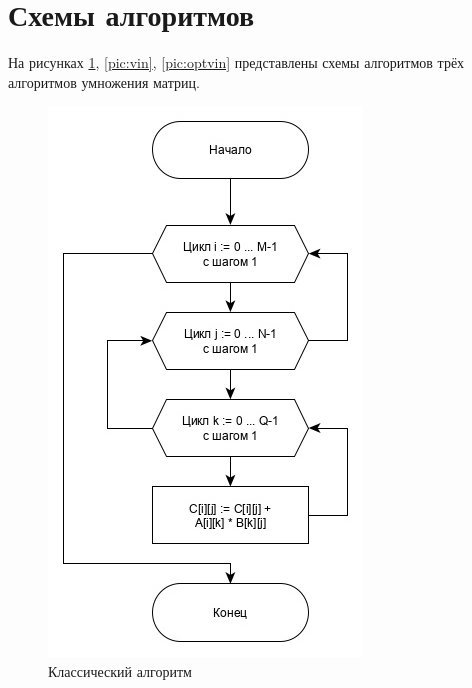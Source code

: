 \documentclass[12pt, a4paper]{report}
\begin{document}
	\section{Схемы алгоритмов}
	На рисунках \ref{pic:clasic}, \ref{pic:vin}, \ref{pic:optvin} представлены схемы алгоритмов трёх алгоритмов умножения матриц.
	\begin{figure}[ht!]
		\centering
		\includegraphics[scale=0.8]{classic.jpg}
		\caption{Классический алгоритм}
		\label{pic:clasic}
	\end{figure}
	\newpage
\end{document}
